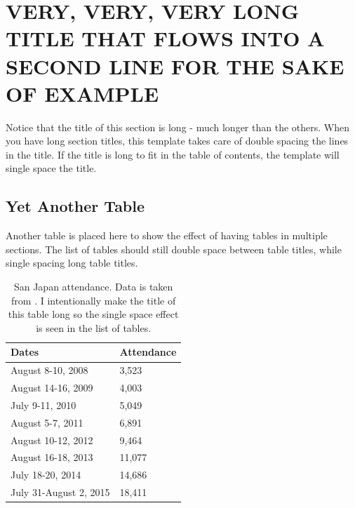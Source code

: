 %
%
%
%
%

\chapter{VERY, VERY, VERY LONG TITLE THAT FLOWS INTO A SECOND LINE FOR THE SAKE OF EXAMPLE}

Notice that the title of this section is long - much longer than the others. When you have long section titles, this template takes care of double spacing the lines in the title. If the title is long to fit in the table of contents, the template will single space the title.

\section{Yet Another Table}

Another table is placed here to show the effect of having tables in multiple sections. The list of tables should still double space between table titles, while single spacing long table titles.

\begin{table}[h!]
	\centering
	\begin{tabular}{|l|l|}
		\hline
		Dates                  & Attendance \\ \hline
		August 8-10, 2008      & 3,523      \\ \hline
		August 14-16, 2009     & 4,003      \\ \hline
		July 9-11, 2010        & 5,049      \\ \hline
		August 5-7, 2011       & 6,891      \\ \hline
		August 10-12, 2012     & 9,464      \\ \hline
		August 16-18, 2013     & 11,077     \\ \hline
		July 18-20, 2014       & 14,686     \\ \hline
		July 31-August 2, 2015 & 18,411     \\ \hline
	\end{tabular}
	\caption{San Japan attendance. Data is taken from \cite{ANCONS}. I intentionally make the title of this table long so the single space effect is seen in the list of tables.}
\end{table}


